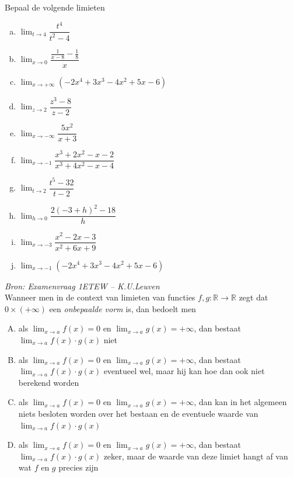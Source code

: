 \documentclass[12pt,twoside,a4paper]{article}
\begin{document}
\begin{oefening}
  Bepaal de volgende limieten
  \begin{multicols}{2}
  \begin{enumerate}[(a)]
  \itemsep1em
  \item $\displaystyle\lim_{t\to 4}\dfrac{t^4}{t^2-4}$
  \item $\displaystyle\lim_{x\to 0}\dfrac{\frac{1}{x-8}-\frac{1}{8}}{x}$
  \item $\displaystyle\lim_{x\to +\infty}\left(-2x^4+3x^3-4x^2+5x-6\right)$
  \item $\displaystyle\lim_{z\to 2}\dfrac{z^3-8}{z-2}$
  \item $\displaystyle\lim_{x\to -\infty}\dfrac{5x^2}{x+3}$
  \item $\displaystyle\lim_{x\to -1}\dfrac{x^3+2x^2-x-2}{x^3+4x^2-x-4}$
  \item $\displaystyle\lim_{t\to 2}\dfrac{t^5-32}{t-2}$
  \item $\displaystyle\lim_{h\to 0}\dfrac{2(-3+h)^2-18}{h}$
  \item $\displaystyle\lim_{x\to -3}\dfrac{x^2-2x-3}{x^2+6x+9}$
  \item $\displaystyle\lim_{x\to -1}\left(-2x^4+3x^3-4x^2+5x-6\right)$
  \end{enumerate}
  \end{multicols}
\end{oefening}

\begin{oefening}{\em\small Bron: Examenvraag 1ETEW -- K.U.Leuven}\\
Wanneer men in de context van limieten van functies $f,g:\mathbb{R}\to\mathbb{R}$ zegt dat $0\times(+\infty)$ een
{\em onbepaalde vorm} is, dan bedoelt men
  \begin{enumerate}[(A)]
  \itemsep1em
  \item als $\lim_{x\to a}f(x)=0$ en $\lim_{x\to a}g(x)=+\infty$, dan bestaat $\lim_{x\to a}f(x)\cdot g(x)$ niet
  \item als $\lim_{x\to a}f(x)=0$ en $\lim_{x\to a}g(x)=+\infty$, dan bestaat $\lim_{x\to a}f(x)\cdot g(x)$ eventueel wel, maar hij kan hoe dan ook niet berekend worden
  \item als $\lim_{x\to a}f(x)=0$ en $\lim_{x\to a}g(x)=+\infty$, dan kan in het algemeen niets besloten worden over het bestaan en de eventuele waarde van $\lim_{x\to a}f(x)\cdot g(x)$
  \item als $\lim_{x\to a}f(x)=0$ en $\lim_{x\to a}g(x)=+\infty$, dan bestaat $\lim_{x\to a}f(x)\cdot g(x)$ zeker, maar de waarde van deze limiet hangt af van wat $f$ en $g$ precies zijn
  \end{enumerate}
\end{oefening}
\end{document}
